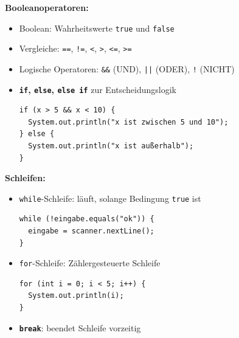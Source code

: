 \documentclass{../../sheet}
\begin{document}
\textbf{Booleanoperatoren:}
\begin{itemize}
    \item Boolean: Wahrheitswerte \texttt{true} und \texttt{false}
    \item Vergleiche: \texttt{==}, \texttt{!=}, \texttt{<}, \texttt{>}, \texttt{<=}, \texttt{>=}
    \item Logische Operatoren: \texttt{\&\&} (UND), \texttt{||} (ODER), \texttt{!} (NICHT)
    \item \textbf{\texttt{if}, \texttt{else}, \texttt{else if}} zur Entscheidungslogik
          \begin{verbatim}
if (x > 5 && x < 10) {
  System.out.println("x ist zwischen 5 und 10");
} else {
  System.out.println("x ist außerhalb");
}
          \end{verbatim}
\end{itemize}
\newpage
\bigskip
\textbf{Schleifen:}
\begin{itemize}
    \item \texttt{while}-Schleife: läuft, solange Bedingung \texttt{true} ist
          \begin{verbatim}
while (!eingabe.equals("ok")) {
  eingabe = scanner.nextLine();
}
          \end{verbatim}
    \item \texttt{for}-Schleife: Zählergesteuerte Schleife
          \begin{verbatim}
for (int i = 0; i < 5; i++) {
  System.out.println(i);
}
          \end{verbatim}
    \item \textbf{\texttt{break}}: beendet Schleife vorzeitig

\end{itemize}
\newpage
{}
\end{document}
